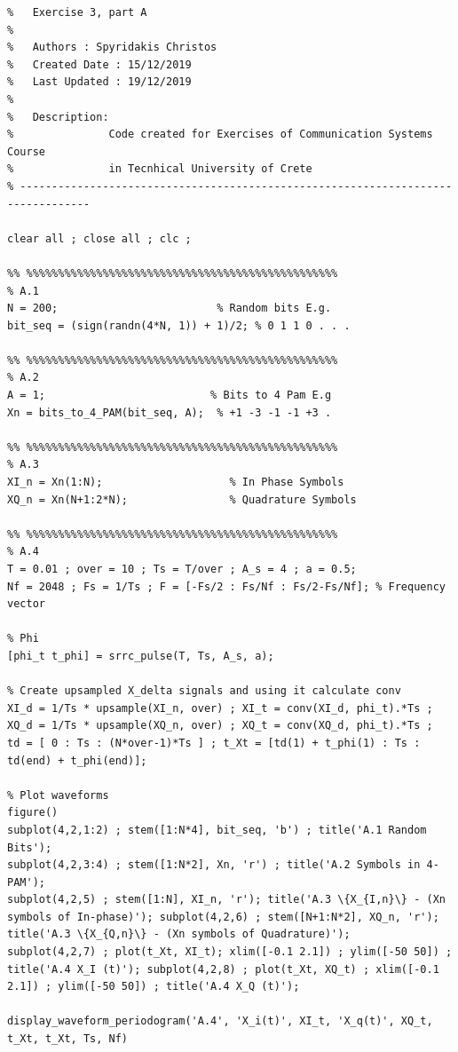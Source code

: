 \documentclass[11pt]{article}
\begin{document}
    \begin{lstlisting}[caption = {\texttt{part\_a.m}}]
% ---------------------------------------------------------------------------------
%   Exercise 3, part A
%
%   Authors : Spyridakis Christos
%   Created Date : 15/12/2019
%   Last Updated : 19/12/2019
%
%   Description: 
%               Code created for Exercises of Communication Systems Course
%               in Tecnhical University of Crete
% ---------------------------------------------------------------------------------

clear all ; close all ; clc ;

%% %%%%%%%%%%%%%%%%%%%%%%%%%%%%%%%%%%%%%%%%%%%%%%%%%
% A.1
N = 200;                         % Random bits E.g.
bit_seq = (sign(randn(4*N, 1)) + 1)/2; % 0 1 1 0 . . .

%% %%%%%%%%%%%%%%%%%%%%%%%%%%%%%%%%%%%%%%%%%%%%%%%%%
% A.2
A = 1;                          % Bits to 4 Pam E.g
Xn = bits_to_4_PAM(bit_seq, A);  % +1 -3 -1 -1 +3 . 

%% %%%%%%%%%%%%%%%%%%%%%%%%%%%%%%%%%%%%%%%%%%%%%%%%%
% A.3
XI_n = Xn(1:N);                    % In Phase Symbols
XQ_n = Xn(N+1:2*N);                % Quadrature Symbols

%% %%%%%%%%%%%%%%%%%%%%%%%%%%%%%%%%%%%%%%%%%%%%%%%%%
% A.4
T = 0.01 ; over = 10 ; Ts = T/over ; A_s = 4 ; a = 0.5; 
Nf = 2048 ; Fs = 1/Ts ; F = [-Fs/2 : Fs/Nf : Fs/2-Fs/Nf]; % Frequency vector

% Phi
[phi_t t_phi] = srrc_pulse(T, Ts, A_s, a);

% Create upsampled X_delta signals and using it calculate conv
XI_d = 1/Ts * upsample(XI_n, over) ; XI_t = conv(XI_d, phi_t).*Ts ;
XQ_d = 1/Ts * upsample(XQ_n, over) ; XQ_t = conv(XQ_d, phi_t).*Ts ;
td = [ 0 : Ts : (N*over-1)*Ts ] ; t_Xt = [td(1) + t_phi(1) : Ts : td(end) + t_phi(end)];

% Plot waveforms
figure()
subplot(4,2,1:2) ; stem([1:N*4], bit_seq, 'b') ; title('A.1 Random Bits');
subplot(4,2,3:4) ; stem([1:N*2], Xn, 'r') ; title('A.2 Symbols in 4-PAM');
subplot(4,2,5) ; stem([1:N], XI_n, 'r'); title('A.3 \{X_{I,n}\} - (Xn symbols of In-phase)'); subplot(4,2,6) ; stem([N+1:N*2], XQ_n, 'r'); title('A.3 \{X_{Q,n}\} - (Xn symbols of Quadrature)'); 
subplot(4,2,7) ; plot(t_Xt, XI_t); xlim([-0.1 2.1]) ; ylim([-50 50]) ; title('A.4 X_I (t)'); subplot(4,2,8) ; plot(t_Xt, XQ_t) ; xlim([-0.1 2.1]) ; ylim([-50 50]) ; title('A.4 X_Q (t)');

display_waveform_periodogram('A.4', 'X_i(t)', XI_t, 'X_q(t)', XQ_t, t_Xt, t_Xt, Ts, Nf)


\end{lstlisting}
\end{document}
